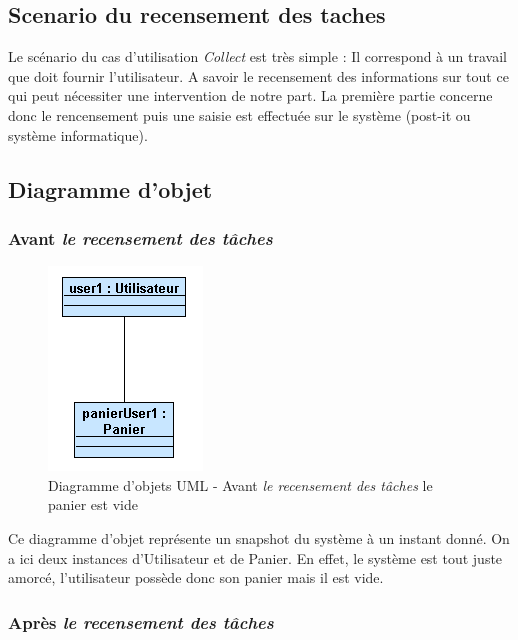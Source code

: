 


\subsection*{Scenario du recensement des taches}

	Le scénario du cas d'utilisation \textit{Collect} est très simple : Il correspond à un travail que doit fournir l'utilisateur. A savoir le recensement des informations sur tout ce qui peut nécessiter une intervention de notre part. La première partie concerne donc le rencensement puis une saisie est effectuée sur le système (post-it ou système informatique).
	
\subsection*{Diagramme d'objet}

\subsubsection {Avant \textit{le recensement des tâches}}

\begin{figure}[H]
	\begin{center}
	\includegraphics[scale=0.8]{diagrams/InstantaneCollectBefore.png}
	\caption{Diagramme d'objets UML  - Avant \textit{le recensement des tâches} le panier est vide}
	\end{center}
	\end{figure}
	
	\bigskip

	Ce diagramme d'objet représente un snapshot du système à un instant donné. On a ici deux instances d'Utilisateur et de Panier. En effet, le système est tout juste amorcé, l'utilisateur possède donc son panier mais il est vide.


\subsubsection {Après \textit{le recensement des tâches}}

